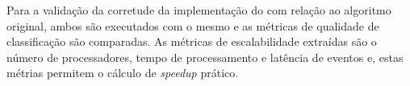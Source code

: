 




Para a validação da corretude da implementação do \mfog com relação ao algoritmo
\minas original, ambos são executados com o mesmo \dataset e as métricas de
qualidade de classificação são comparadas.
As métricas de escalabilidade extraídas são o número de processadores, tempo de
processamento e latência de eventos e, estas métrias permitem o cálculo de
\emph{speedup} prático.


